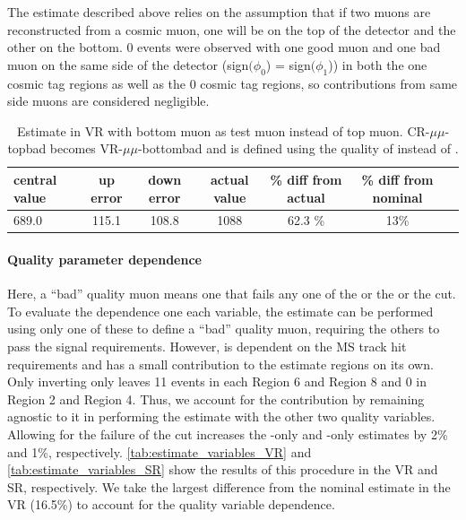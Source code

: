 The estimate described above relies on the assumption that if two muons are reconstructed from a cosmic muon, one will be on the top of the detector and the other on the bottom. 0 events were observed with one good muon and one bad muon on the same side of the detector (sign$(\phi_{0}$) = sign$(\phi_{1}$)) in both the one cosmic tag regions as well as the 0 cosmic tag regions, so contributions from same side muons are considered negligible.

\begin{table}
\centering
\begin{tabular}{lcccccc}
central value  & up error & down error & actual value & \% diff from actual & \% diff from nominal\\
\hline
689.0  & 115.1 & 108.8 & 1088 & 62.3 \% & 13\% \\
\hline
\end{tabular}
\caption{Estimate in VR with bottom muon as test muon instead of top muon. CR-$\mu\mu$-topbad becomes VR-$\mu\mu$-bottombad and \rgood is defined using the quality of \mb instead of \mt.}
\label{tab:syst-orientation}
\end{table}


\paragraph{Quality parameter dependence}

Here, a ``bad'' quality muon means one that fails any one of the \nprecision or the \nphi or the \chiCB cut. To evaluate the dependence one each variable, the estimate can be performed using only one of these to define a ``bad'' quality muon, requiring the others to pass the signal requirements. However, \chiCB is dependent on the MS track hit requirements and has a small contribution to the estimate regions on its own. Only inverting only \chiCB leaves 11 events in each Region 6 and Region 8 and 0 in Region 2 and Region 4. Thus, we account for the \chiCB contribution by remaining agnostic to it in performing the estimate with the other two quality variables.  Allowing for the failure of the \chiCB cut increases the \nprecision-only and \nphi-only estimates by 2\% and 1\%, respectively. \autoref{tab:estimate_variables_VR} and \autoref{tab:estimate_variables_SR} show the results of this procedure in the VR and SR, respectively. We take the largest difference from the nominal estimate in the VR (16.5\%) to account for the quality variable dependence. 

